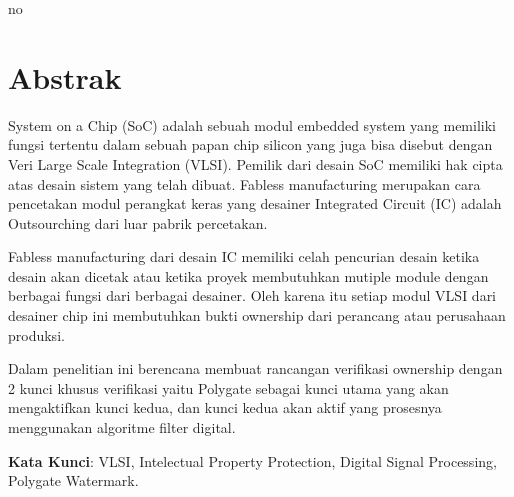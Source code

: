 no\chapter*{Abstrak}

\noindent System on a Chip (SoC) adalah sebuah modul embedded system yang memiliki fungsi tertentu dalam sebuah papan chip silicon yang juga bisa disebut dengan Veri Large Scale Integration (VLSI). Pemilik dari desain SoC memiliki hak cipta atas desain sistem yang telah dibuat. Fabless manufacturing merupakan cara pencetakan modul perangkat keras yang desainer Integrated Circuit (IC) adalah Outsourching dari luar pabrik percetakan.

\vspace*{0.5cm}
\noindent Fabless manufacturing dari desain IC memiliki celah pencurian desain ketika desain akan dicetak atau ketika proyek membutuhkan mutiple module dengan berbagai fungsi dari berbagai desainer. Oleh karena itu setiap modul VLSI dari desainer chip ini membutuhkan bukti ownership dari perancang atau perusahaan produksi.

\vspace*{0.5cm}
\noindent Dalam penelitian ini berencana membuat rancangan verifikasi ownership dengan 2 kunci khusus verifikasi yaitu Polygate sebagai kunci utama yang akan mengaktifkan kunci kedua, dan kunci kedua akan aktif yang prosesnya menggunakan algoritme filter digital.

\vspace*{0.5cm}

\noindent \textbf{Kata Kunci}: VLSI, Intelectual Property Protection, Digital Signal Processing, Polygate Watermark.

\newpage